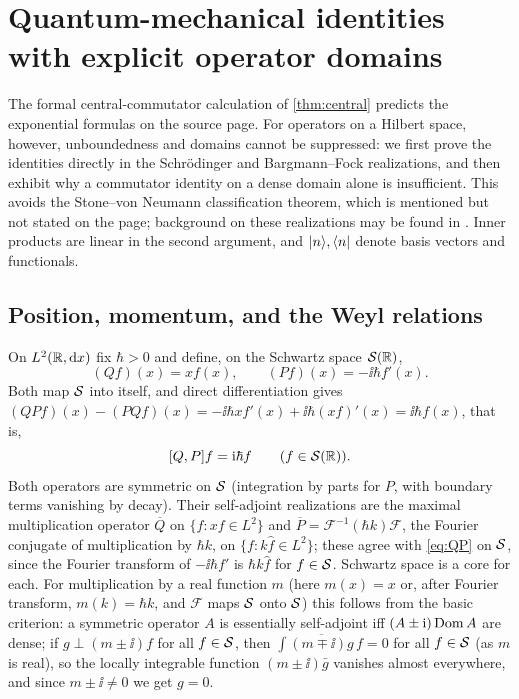 \section{Quantum-mechanical identities with explicit operator domains}\label{sec:quantum}
The formal central-commutator calculation of \cref{thm:central} predicts
the exponential formulas on the source page. For operators on a Hilbert
space, however, unboundedness and domains cannot be suppressed: we first
prove the identities directly in the Schr\"odinger and Bargmann--Fock
realizations, and then exhibit why a commutator identity on a dense domain
alone is insufficient. This avoids the Stone--von Neumann classification
theorem, which is mentioned but not stated on the page; background on these
realizations may be found in \cite{hall,glauber,wilcox}. Inner products are
linear in the second argument, and $\lvert n\rangle,\langle n\rvert$ denote basis vectors and
functionals.

\subsection{Position, momentum, and the Weyl relations}
On $L^2(\mathbb{R},\mathrm{d} x)$ fix $\hbar>0$ and define, on the Schwartz space
$\mathcal{S}(\mathbb{R})$,
\begin{equation}\label{eq:QP}
 (Qf)(x)=xf(x),\qquad (Pf)(x)=-\ii\hbar f'(x).
\end{equation}
Both map $\mathcal{S}$ into itself, and direct differentiation gives
$(QPf)(x)-(PQf)(x)=-\ii\hbar xf'(x)+\ii\hbar(xf)'(x)=\ii\hbar f(x)$, that is,
\begin{equation}\label{eq:CCR}
 [Q,P]f=\mathrm{i}\hbar f\qquad(f\in\mathcal{S}(\mathbb{R})).
\end{equation}
Both operators are symmetric on $\mathcal{S}$ (integration by parts for $P$, with
boundary terms vanishing by decay). Their self-adjoint realizations are the
maximal multiplication operator $\overline Q$ on
$\{f:xf\in L^2\}$ and $\overline P=\mathcal F^{-1}(\hbar k)\mathcal F$, the
Fourier conjugate of multiplication by $\hbar k$, on $\{f:k\hat f\in L^2\}$;
these agree with \eqref{eq:QP} on $\mathcal{S}$, since the Fourier transform of
$-\ii\hbar f'$ is $\hbar k\hat f$ for $f\in\mathcal{S}$. Schwartz space is a core
for each. For multiplication by a real function $m$ (here $m(x)=x$ or, after
Fourier transform, $m(k)=\hbar k$, and $\mathcal F$ maps $\mathcal{S}$ onto $\mathcal{S}$)
this follows from the basic criterion: a symmetric operator $A$ is
essentially self-adjoint iff $(A\pm\mathrm{i})\operatorname{Dom} A$ are dense; if $g\perp(m\pm\ii)f$
for all $f\in\mathcal{S}$, then $\int\overline{(m\mp\ii)g}\,f=0$ for all $f\in\mathcal{S}$
(as $m$ is real), so the locally integrable function $(m\pm\ii)\bar g$
vanishes almost everywhere, and since $m\pm\ii\neq0$ we get $g=0$.


